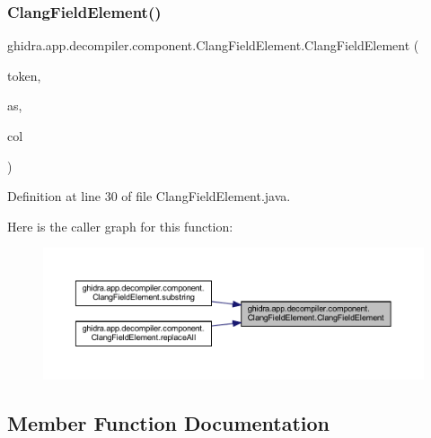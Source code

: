 \subsubsection{\texorpdfstring{ClangFieldElement()}{ClangFieldElement()}}
{\footnotesize\ttfamily ghidra.\+app.\+decompiler.\+component.\+Clang\+Field\+Element.\+Clang\+Field\+Element (\begin{DoxyParamCaption}\item[{\mbox{\hyperlink{classghidra_1_1app_1_1decompiler_1_1_clang_token}{Clang\+Token}}}]{token,  }\item[{Attributed\+String}]{as,  }\item[{int}]{col }\end{DoxyParamCaption})\hspace{0.3cm}{\ttfamily [inline]}}



Definition at line 30 of file Clang\+Field\+Element.\+java.

Here is the caller graph for this function\+:
\nopagebreak
\begin{figure}[H]
\begin{center}
\leavevmode
\includegraphics[width=350pt]{classghidra_1_1app_1_1decompiler_1_1component_1_1_clang_field_element_a557c4aea8e9cecacb4508e4938722a7b_icgraph}
\end{center}
\end{figure}


\subsection{Member Function Documentation}
\mbox{\label{classghidra_1_1app_1_1decompiler_1_1component_1_1_clang_field_element_a29f41d0996ebfc39f427636021736ad4}} 
